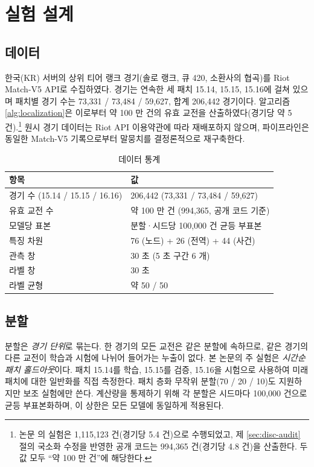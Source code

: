 \chapter{실험 설계}
\label{ch:setup}

\section{데이터}
\label{sec:setup-data}

한국(KR) 서버의 상위 티어 랭크 경기(솔로 랭크, 큐 420, 소환사의 협곡)를 Riot Match-V5 API로 수집하였다. 경기는 연속한 세 패치 15.14, 15.15, 15.16에 걸쳐 있으며 패치별 경기 수는 73{,}331 / 73{,}484 / 59{,}627, 합계 206{,}442 경기이다. 알고리즘 \ref{alg:localization}은 이로부터 약 100 만 건의 유효 교전을 산출하였다(경기당 약 5 건).\footnote{논문 \cite{baek2026killconditioned}의 실험은 1{,}115{,}123 건(경기당 5.4 건)으로 수행되었고, 제 \ref{sec:disc-audit} 절의 국소화 수정을 반영한 공개 코드는 994{,}365 건(경기당 4.8 건)을 산출한다. 두 값 모두 ``약 100 만 건''에 해당한다.} 원시 경기 데이터는 Riot API 이용약관에 따라 재배포하지 않으며, 파이프라인은 동일한 Match-V5 기록으로부터 말뭉치를 결정론적으로 재구축한다.

\begin{table}[htbp]
  \centering
  \caption{데이터 통계}
  \label{tab:data}
  \small
  \begin{tabular}{@{}ll@{}}
    \toprule
    항목 & 값 \\
    \midrule
    경기 수 (15.14 / 15.15 / 16.16) & 206{,}442 (73{,}331 / 73{,}484 / 59{,}627) \\
    유효 교전 수 & 약 100 만 건 (994{,}365, 공개 코드 기준) \\
    모델당 표본 & 분할·시드당 100{,}000 건 균등 부표본 \\
    특징 차원 & 76 (노드) + 26 (전역) + 44 (사건) \\
    관측 창 & 30 초 (5 초 구간 6 개) \\
    라벨 창 & 30 초 \\
    라벨 균형 & 약 50 / 50 \\
    \bottomrule
  \end{tabular}
\end{table}

\section{분할}
\label{sec:setup-split}

분할은 \emph{경기 단위}로 묶는다. 한 경기의 모든 교전은 같은 분할에 속하므로, 같은 경기의 다른 교전이 학습과 시험에 나뉘어 들어가는 누출이 없다. 본 논문의 주 실험은 \emph{시간순 패치 홀드아웃}이다. 패치 15.14를 학습, 15.15를 검증, 15.16을 시험으로 사용하여 미래 패치에 대한 일반화를 직접 측정한다. 패치 층화 무작위 분할(70 / 20 / 10)도 지원하지만 보조 실험에만 쓴다. 계산량을 통제하기 위해 각 분할은 시드마다 100{,}000 건으로 균등 부표본화하며, 이 상한은 모든 모델에 동일하게 적용된다.

